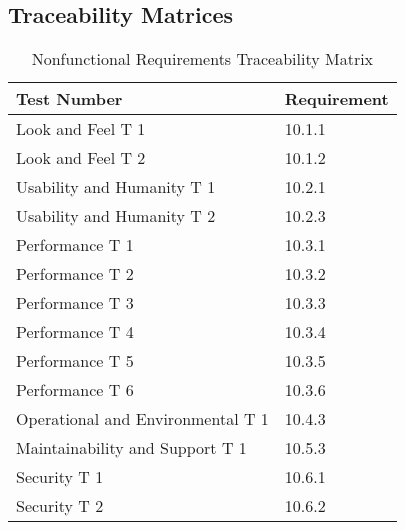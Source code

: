 \documentclass[12pt, titlepage]{article}
\begin{document}
\subsection*{Traceability Matrices}
\begin{table}[H]
	\caption{Nonfunctional Requirements Traceability Matrix} \label{TraceMatrix2}
	\begin{tabular}{ll}
		\toprule
		\textbf{Test Number} & \textbf{Requirement} \\
		\midrule
		Look and Feel T 1 & 10.1.1\\
		Look and Feel T 2 & 10.1.2\\
		\midrule
		Usability and Humanity T 1 & 10.2.1\\
		Usability and Humanity T 2 & 10.2.3\\
		\midrule
		Performance T 1 & 10.3.1\\
		Performance T 2 & 10.3.2\\
		Performance T 3 & 10.3.3\\
		Performance T 4 & 10.3.4\\
		Performance T 5 & 10.3.5\\
		Performance T 6 & 10.3.6\\
		\midrule
		Operational and Environmental T 1 & 10.4.3\\
		\midrule
		Maintainability and Support T 1 & 10.5.3\\
		\midrule
		Security T 1 & 10.6.1\\
		Security T 2 & 10.6.2\\
		\bottomrule
	\end{tabular}
\end{table}
\end{document}
